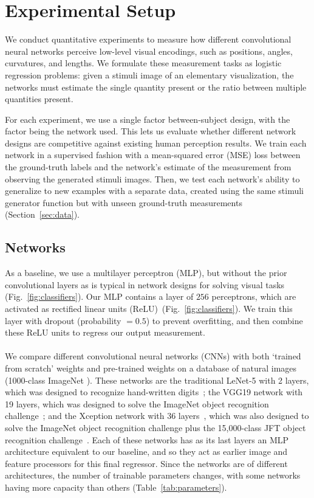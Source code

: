 \section{Experimental Setup}

We conduct quantitative experiments to measure how different convolutional neural networks perceive low-level visual encodings, such as positions, angles, curvatures, and lengths. We formulate these measurement tasks as logistic regression problems: given a stimuli image of an elementary visualization, the networks must estimate the single quantity present or the ratio between multiple quantities present. 

For each experiment, we use a single factor between-subject design, with the factor being the network used. This lets us evaluate whether different network designs are competitive against existing human perception results. We train each network in a supervised fashion with a mean-squared error (MSE) loss between the ground-truth labels and the network's estimate of the measurement from observing the generated stimuli images. Then, we test each network's ability to generalize to new examples with a separate data, created using the same stimuli generator function but with unseen ground-truth measurements (Section~\ref{sec:data}).


\subsection{Networks}
\label{sec:networks}

 As a baseline, we use a multilayer perceptron (MLP), but without the prior convolutional layers as is typical in network designs for solving visual tasks (Fig.~\ref{fig:classifiers}). Our MLP contains a layer of $256$ perceptrons, which are activated as rectified linear units (ReLU)~(Fig.~\ref{fig:classifiers}). We train this layer with dropout (probability $= 0.5$) to prevent overfitting, and then combine these ReLU units to regress our output measurement.
\\~\\
 We compare different convolutional neural networks (CNNs) with both `trained from scratch' weights and pre-trained weights on a database of natural images (1000-class ImageNet \cite{imagenet}). These networks are the traditional LeNet-5 with 2 layers, which was designed to recognize hand-written digits~\cite{lenet}; the VGG19 network with 19 layers, which was designed to solve the ImageNet object recognition challenge~\cite{simonyan_very_deep2014}; and the Xception network with 36 layers~\cite{xception}, which was also designed to solve the ImageNet object recognition challenge plus the 15,000-class JFT object recognition challenge~\cite{Hinton2015}. Each of these networks has as its last layers an MLP architecture equivalent to our baseline, and so they act as earlier image and feature processors for this final regressor. Since the networks are of different architectures, the number of trainable parameters changes, with some networks having more capacity than others (Table~\ref{tab:parameters}).

